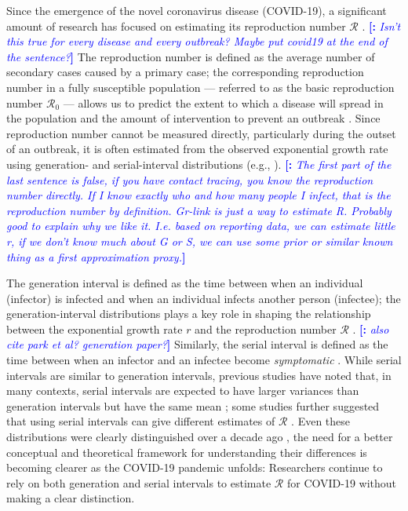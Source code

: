 \documentclass[12pt]{article}
\newcommand{\comment}{\showcomment}
\newcommand{\showcomment}[3]{\textcolor{#1}{\textbf{[#2: }\textsl{#3}\textbf{]}}}
\newcommand{\mli}[1]{\comment{blue}{}{#1}}
\begin{document}
Since the emergence of the novel coronavirus disease (COVID-19), a significant amount of research has focused on estimating its reproduction number $\mathcal R$ \citep{majumder2020early}.
\mli{Isn't this true for every disease and every outbreak? Maybe put covid19 at the end of the sentence?}
The reproduction number is defined as the average number of secondary cases caused by a primary case;
the corresponding reproduction number in a fully susceptible population --- referred to as the basic reproduction number $\mathcal R_0$ --- allows us to predict the extent to which a disease will spread in the population and the amount of intervention to prevent an outbreak \citep{anderson1991infectious}.
Since reproduction number cannot be measured directly, particularly during the outset of an outbreak, it is often estimated from the observed exponential growth rate using generation- and serial-interval distributions (e.g., \cite{du2020serial, jung2020real, li2020early, zhao2020preliminary}).
\mli{The first part of the last sentence is false, if you have contact tracing, you know the reproduction number directly. If I know exactly who and how many people I infect, that is the reproduction number by definition. Gr-link is just a way to estimate R. Probably good to explain why we like it. I.e. based on reporting data, we can estimate little r, if we don't know much about G or S, we can use some prior or similar known thing as a first approximation proxy.}

The generation interval is defined as the time between when an individual (infector) is infected and when an individual infects another person (infectee);
the generation-interval distributions plays a key role in shaping the relationship between the exponential growth rate $r$ and the reproduction number $\mathcal R$ \citep{wallinga2007generation}. \mli{also cite park et al? generation paper?}
Similarly, the serial interval is defined as the time between when an infector and an infectee become \emph{symptomatic} \citep{svensson2007note}.
While serial intervals are similar to generation intervals, previous studies have noted that, in many contexts, serial intervals are expected to have larger variances than generation intervals but have the same mean \citep{svensson2007note,klinkenberg2011correlation,te2013estimating,champredon2018equivalence};
some studies further suggested that using serial intervals can give different estimates of $\mathcal R$ \citep{britton2019estimation}.
Even these distributions were clearly distinguished over a decade ago \citep{svensson2007note}, 
the need for a better conceptual and theoretical framework for understanding their differences is becoming clearer as the COVID-19 pandemic unfolds:
Researchers continue to rely on both generation and serial intervals to estimate $\mathcal R$ for COVID-19 without making a clear distinction.
\end{document}
